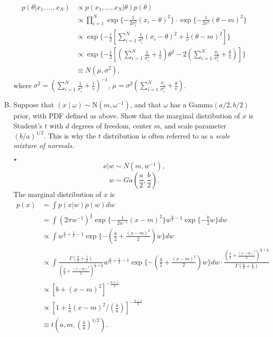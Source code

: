\documentclass[11pt]{article}
\newcommand{\jie}{$\star$ }
\newcommand{\N}{\mbox{N}}
\begin{document}
\begin{enumerate}[(A)]
\begin{align*}
    p(\theta|x_1,\dots,x_N) &\propto p(x_1,\dots,x_N |\theta) p(\theta) \\
    &\propto \prod_{i=1}^N \exp \{-\frac{1}{2\sigma_i^2} (x_i-\theta)^2\} \cdot \exp \{-\frac{1}{2v^2} (\theta-m)^2\} \\
    &\propto \exp \{ -\frac{1}{2} [\sum_{i=1}^N \frac{1}{\sigma_i^2} (x_i-\theta)^2 + \frac{1}{v} (\theta-m)^2] \} \\
    &\propto \exp \{ -\frac{1}{2} [(\sum_{i=1}^N \frac{1}{\sigma_i^2} + \frac{1}{v}) \theta^2 - 2 (\sum_{i=1}^N \frac{x_i}{\sigma_i^2} + \frac{\theta}{v})] \} \\
    &\equiv N(\mu, \sigma^2),
\end{align*}
where $\sigma^2 = (\sum_{i=1}^N \frac{1}{\sigma_i^2} + \frac{1}{v} )^{-1}$, $\mu = \sigma^2 (\sum_{i=1}^N \frac{x_i}{\sigma_i^2} + \frac{\theta}{v})$.

\bigskip

\item Suppose that $(x \mid \omega) \sim \N(m, \omega^{-1})$, and that $\omega$ has a Gamma$(a/2, b/2)$ prior, with PDF defined as above.  Show that the marginal distribution of $x$ is Student's $t$ with $d$ degrees of freedom, center $m$, and scale parameter $(b/a)^{1/2}$.  This is why the $t$ distribution is often referred to as a \textit{scale mixture of normals}.

\bigskip

\jie
$$x|w \sim N(m,w^{-1}),$$
$$w \sim Ga(\frac{a}{2}, \frac{b}{2}).$$
The marginal distribution of $x$ is
\begin{align*}
    p(x) &= \int p(x|w) p(w) dw \\
    &= \int (2\pi w^{-1})^{\frac{1}{2}} \exp \{ -\frac{1}{2w^{-1}} (x-m)^2 \} w^{\frac{a}{2}-1} \exp \{-\frac{b}{2}w\} dw \\
    &\propto \int w^{\frac{a}{2}+\frac{1}{2} -1} \exp \{-(\frac{b}{2}+\frac{(x-m)^2}{2})w \} dw \\
    &\propto \int \frac{\Gamma(\frac{a}{2} + \frac{1}{2})}{(\frac{b}{2} + \frac{(x-m)^2}{2} )^{\frac{a}{2}+\frac{1}{2}} } w^{\frac{a}{2}+\frac{1}{2} -1} \exp \{-(\frac{b}{2}+\frac{(x-m)^2}{2})w \} dw \cdot \frac{(\frac{b}{2} + \frac{(x-m)^2}{2} )^{\frac{a}{2}+\frac{1}{2}} }{\Gamma(\frac{a}{2} + \frac{1}{2})} \\
    &\propto [b+(x-m)^2]^{-\frac{a+1}{2}} \\
    &\propto [1+\frac{1}{a}(x-m)^2/(\frac{b}{a})]^{-\frac{a+1}{2}} \\
    &\equiv t(a,m,(\frac{b}{a})^{1/2}).
\end{align*}

\bigskip

\end{enumerate}
\end{document}
